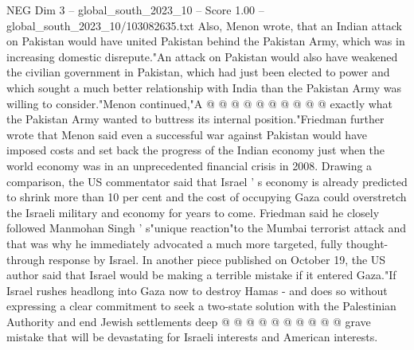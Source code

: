 \begin{textsample}{NEG Dim 3 – global\_south\_2023\_10 – Score 1.00 – global\_south\_2023\_10/103082635.txt}
Also, Menon wrote, that an Indian attack on Pakistan would have united Pakistan behind the Pakistan Army, which was in increasing domestic disrepute."An attack on Pakistan would also have weakened the civilian government in Pakistan, which had just been elected to power and which sought a much better relationship with India than the Pakistan Army was willing to consider."Menon continued,"A @ @ @ @ @ @ @ @ @ @ exactly what the Pakistan Army wanted to buttress its internal position."Friedman further wrote that Menon said even a successful war against Pakistan would have imposed costs and set back the progress of the Indian economy just when the world economy was in an unprecedented financial crisis in 2008.
Drawing a comparison, the US commentator said that Israel ' s economy is already predicted to shrink more than 10 per cent and the cost of occupying Gaza could overstretch the Israeli military and economy for years to come.
Friedman said he closely followed Manmohan Singh ' s"unique reaction"to the Mumbai terrorist attack and that was why he immediately advocated a much more targeted, fully thought-through response by Israel.
In another piece published on October 19, the US author said that Israel would be making a terrible mistake if it entered Gaza."If Israel rushes headlong into Gaza now to destroy Hamas - and does so without expressing a clear commitment to seek a two-state solution with the Palestinian Authority and end Jewish settlements deep @ @ @ @ @ @ @ @ @ @ grave mistake that will be devastating for Israeli interests and American interests.

\end{textsample}

